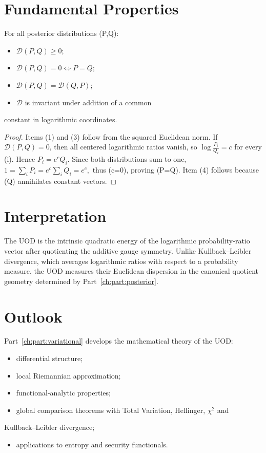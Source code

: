 \section{Fundamental Properties}\label{ch:sec:fundamental-properties}
\begin{proposition}
\label{ch:prop:21-4}
For all posterior distributions (P,Q):
\begin{itemize}
  \item \(\mathcal{D}(P,Q)\ge0\);
  \item \(\mathcal{D}(P,Q)=0\iff P=Q\);
  \item \(\mathcal{D}(P,Q)=\mathcal{D}(Q,P)\);
  \item \(\mathcal{D}\) is invariant under addition of a common
\end{itemize}
    constant in logarithmic coordinates.
\begin{proof}
Items (1) and (3) follow from the squared Euclidean norm.
If \(\mathcal{D}(P,Q)=0\), then all centered logarithmic ratios
vanish, so
$\log\frac{P_i}{Q_i}=c$
for every (i). Hence \(P_i=e^{c}Q_i\). Since both distributions sum to one,
$1=\sum_{i}P_i=e^{c}\sum_{i}Q_i=e^{c},$
thus (c=0), proving (P=Q).
Item (4) follows because (Q) annihilates constant vectors.
\end{proof}
\end{proposition}
\section{Interpretation}\label{ch:sec:interpretation}
The UOD is the intrinsic quadratic energy of the logarithmic
probability-ratio vector after quotienting the additive gauge symmetry.
Unlike Kullback--Leibler divergence, which averages logarithmic ratios
with respect to a probability measure, the UOD measures their Euclidean
dispersion in the canonical quotient geometry determined by Part~\ref{ch:part:posterior}.
\section{Outlook}\label{ch:sec:outlook}
Part~\ref{ch:part:variational} develops the mathematical theory of the UOD:
\begin{itemize}
  \item differential structure;\label{ch:sec:differential-uod}
  \item local Riemannian approximation;
  \item functional-analytic properties;\label{ch:sec:functional-uod}
  \item global comparison theorems with Total Variation, Hellinger, $\chi^2$ and
\end{itemize}
    Kullback--Leibler divergence;
\begin{itemize}
  \item applications to entropy and security functionals.
\end{itemize}


